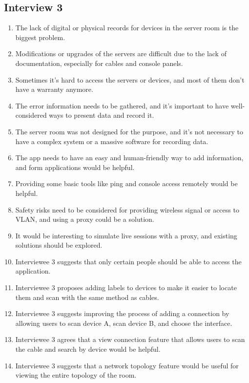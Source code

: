 \subsection{Interview 3}
\label {sec:thematicAnalysisInterview3}
\begin{enumerate}
    \item The lack of digital or physical records for devices in the server room is the biggest problem.
    \item Modifications or upgrades of the servers are difficult due to the lack of documentation, especially for cables and console panels.
    \item Sometimes it's hard to access the servers or devices, and most of them don't have a warranty anymore.
    \item The error information needs to be gathered, and it's important to have well-considered ways to present data and record it.
    \item The server room was not designed for the purpose, and it's not necessary to have a complex system or a massive software for recording data.
    \item The app needs to have an easy and human-friendly way to add information, and form applications would be helpful.
    \item Providing some basic tools like ping and console access remotely would be helpful.
    \item Safety risks need to be considered for providing wireless signal or access to VLAN, and using a proxy could be a solution.
    \item It would be interesting to simulate live sessions with a proxy, and existing solutions should be explored.
    \item Interviewee 3 suggests that only certain people should be able to access the application.
    \item Interviewee 3 proposes adding labels to devices to make it easier to locate them and scan with the same method as cables.
    \item Interviewee 3 suggests improving the process of adding a connection by allowing users to scan device A, scan device B, and choose the interface.
    \item Interviewee 3 agrees that a view connection feature that allows users to scan the cable and search by device would be helpful.
    \item Interviewee 3 suggests that a network topology feature would be useful for viewing the entire topology of the room.

\end{enumerate}
